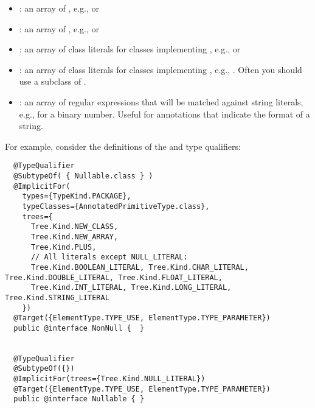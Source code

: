   \begin{itemize}
  \item {}: an array of
    \href{\TreeAPIBase{}/tree/Tree.Kind.html?is-external=true}{}, e.g.,
     or 
  \item {}: an array of
    , e.g., 
    or 
  \item
    \begin{sloppypar}
    : an array of class literals for classes
    implementing , e.g.,
     or 
    \end{sloppypar}
  \item {}: an array of class literals for classes
    implementing , e.g.,
    .  Often you should use
    a subclass of .
  \item {}: an array of regular expressions that will
    be matched against
    string literals, e.g.,  for a binary number.  Useful
    for annotations that indicate the format of a string.
  \end{itemize}

For example, consider the definitions of the  and 
type qualifiers:

\begin{smaller}
\begin{Verbatim}
  @TypeQualifier
  @SubtypeOf( { Nullable.class } )
  @ImplicitFor(
    types={TypeKind.PACKAGE},
    typeClasses={AnnotatedPrimitiveType.class},
    trees={
      Tree.Kind.NEW_CLASS,
      Tree.Kind.NEW_ARRAY,
      Tree.Kind.PLUS,
      // All literals except NULL_LITERAL:
      Tree.Kind.BOOLEAN_LITERAL, Tree.Kind.CHAR_LITERAL, Tree.Kind.DOUBLE_LITERAL, Tree.Kind.FLOAT_LITERAL,
      Tree.Kind.INT_LITERAL, Tree.Kind.LONG_LITERAL, Tree.Kind.STRING_LITERAL
    })
  @Target({ElementType.TYPE_USE, ElementType.TYPE_PARAMETER})
  public @interface NonNull {  }


  @TypeQualifier
  @SubtypeOf({})
  @ImplicitFor(trees={Tree.Kind.NULL_LITERAL})
  @Target({ElementType.TYPE_USE, ElementType.TYPE_PARAMETER})
  public @interface Nullable { }
\end{Verbatim}
\end{smaller}


